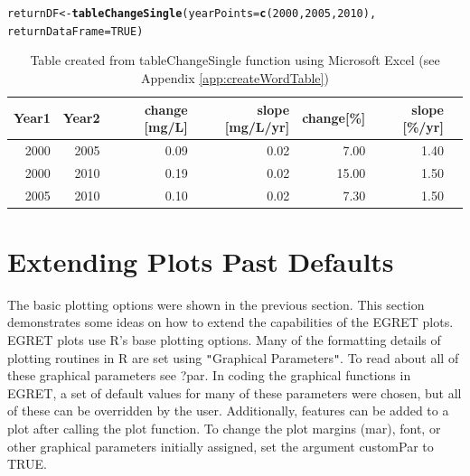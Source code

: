 \documentclass[a4paper,11pt]{article}\usepackage{graphicx, color}
\makeatletter
\newcommand{\hlfunctioncall}[1]{\textcolor[rgb]{0.501960784313725,0,0.329411764705882}{\textbf{#1}}}%
\newenvironment{kframe}{%
 \def\at@end@of@kframe{}%
 \ifinner\ifhmode%
  \def\at@end@of@kframe{\end{minipage}}%
  \begin{minipage}{\columnwidth}%
 \fi\fi%
 \def\FrameCommand##1{\hskip\@totalleftmargin \hskip-\fboxsep
 \colorbox{shadecolor}{##1}\hskip-\fboxsep
     \hskip-\linewidth \hskip-\@totalleftmargin \hskip\columnwidth}%
 \MakeFramed {\advance\hsize-\width
   \@totalleftmargin\z@ \linewidth\hsize
   \@setminipage}}%
 {\par\unskip\endMakeFramed%
 \at@end@of@kframe}
\newenvironment{knitrout}{}{} %
\makeatother
\begin{document}
\begin{knitrout}
\color{fgcolor}\begin{kframe}
\begin{alltt}
returnDF <- \hlfunctioncall{tableChangeSingle}(yearPoints=\hlfunctioncall{c}(2000,2005,2010), 
                              returnDataFrame=TRUE)
\end{alltt}
\end{kframe}
\end{knitrout}


\begin{table}[ht]
\centering
\begin{tabular}{rrrrrrr}
  \hline
Year1 & Year2 & change [mg/L] & slope [mg/L/yr] & change[\%] & slope [\%/yr] \\ 
  \hline
2000 & 2005 & 0.09 & 0.02 & 7.00 & 1.40 \\ 
2000 & 2010 & 0.19 & 0.02 & 15.00 & 1.50 \\ 
2005 & 2010 & 0.10 & 0.02 & 7.30 & 1.50 \\ 
   \hline
\end{tabular}
\caption{Table created from tableChangeSingle function using Microsoft Excel (see Appendix \ref{app:createWordTable})} 
\label{table:tableChangeSingle}
\end{table}


\clearpage

\FloatBarrier


\section{Extending Plots Past Defaults}
\label{sec:extendedPlots}

\FloatBarrier

The basic plotting options were shown in the previous section.  This section demonstrates some ideas on how to extend the capabilities of the EGRET plots. EGRET plots use R's base plotting options. Many of the formatting details of plotting routines in R are set using \texttt{"}Graphical Parameters\texttt{"}.  To read about all of these graphical parameters see ?par.  In coding the graphical functions in EGRET, a set of default values for many of these parameters were chosen, but all of these can be overridden by the user. Additionally, features can be added to a plot after calling the plot function. To change the plot margins (mar), font, or other graphical parameters initially assigned, set the argument customPar to TRUE.
\end{document}
